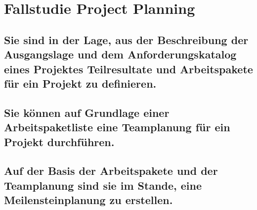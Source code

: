\chapter{Fallstudie Project Planning}

\section{Sie sind in der Lage, aus der Beschreibung der Ausgangslage und dem Anforderungskatalog eines Projektes Teilresultate und Arbeitspakete für ein Projekt zu definieren.}

\section{Sie können auf Grundlage einer Arbeitspaketliste eine Teamplanung für ein Projekt durchführen.}

\section{Auf der Basis der Arbeitspakete und der Teamplanung sind sie im Stande, eine Meilensteinplanung zu erstellen.}